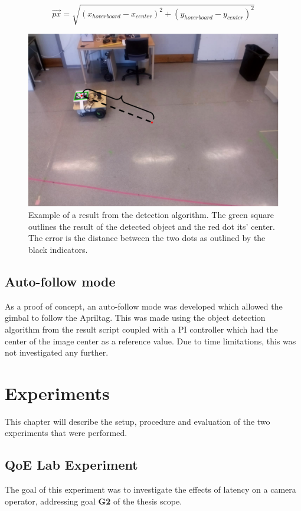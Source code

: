 \documentclass[nofilelist]{cslthse-msc}
\begin{document}
\begin{equation}
   \label{eq:distance}
   \overrightarrow{px} = \sqrt{(x_{hoverboard} - x_{center})^2 + (y_{hoverboard} - y_{center})^2}
\end{equation}


\begin{figure}[!hbt]
   \centering
   \includegraphics[scale=0.3]{images/resultcalc.png} 
   \caption{Example of a result from the detection algorithm. The green square outlines the result of the detected object and the red dot its' center. The error is the distance between the two dots as outlined by the black indicators.}
   \label{fig:resultcalc}
\end{figure}

\section{Auto-follow mode}
As a proof of concept, an auto-follow mode was developed which allowed the gimbal to follow the Apriltag. This was made using the object detection algorithm from the result script coupled with a PI controller which had the center of the image center as a reference value. Due to time limitations, this was not investigated any further.

\chapter{Experiments}
This chapter will describe the setup, procedure and evaluation of the two experiments that were performed.

\section{QoE Lab Experiment}
The goal of this experiment was to investigate the effects of latency on a camera operator, addressing goal \textbf{G2} of the thesis scope.
\end{document}
